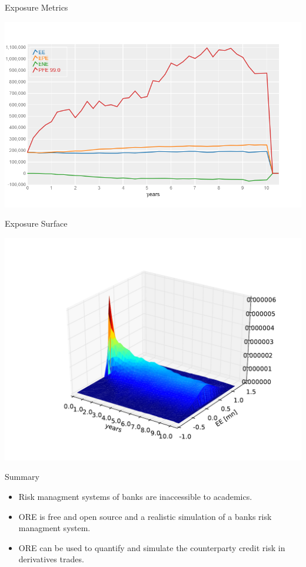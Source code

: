\documentclass[t]{beamer}
\begin{document}
\begin{frame}{Exposure Metrics}
	\begin{center}
		\includegraphics[scale=0.4]{pics/bqp_exposure_metrics.png}
	\end{center}
\end{frame}

\begin{frame}{Exposure Surface}
	\begin{center}
		\includegraphics[scale=0.5]{pics/mpl_exposure_surface.pdf}
	\end{center}
\end{frame}

\begin{frame}{Summary}
	\begin{itemize}
		\item
			Risk managment systems of banks are inaccessible to academics.
		\item
			ORE is free and open source and a realistic simulation of a banks risk managment system.
		\item
			ORE can be used to quantify and simulate the counterparty credit risk in derivatives trades.
	\end{itemize}
\end{frame}
\end{document}
